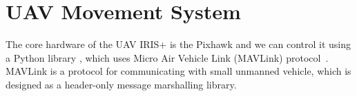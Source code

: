\documentclass[conference,harvard,brazil,english]{sbatex}
\newcommand{\R}{\mathbb R}
\begin{document}
%

\section{UAV Movement System}
\label{sec:uav}


The core hardware of the UAV IRIS+ is the Pixhawk and we can control it using a Python library \cite{dronekit}, which uses Micro Air Vehicle Link (MAVLink) protocol~\cite{meier2011pixhawk}. MAVLink is a protocol for communicating with small unmanned vehicle, which is designed as a header-only message marshalling library.
\end{document}
